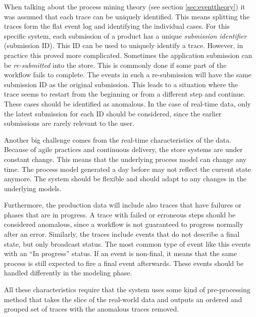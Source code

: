 When talking about the process mining theory (see section \ref{sec:eventtheory}) it was assumed that each trace can be uniquely identified.
This means splitting the traces form the flat event log and identifying the individual cases.
For this specific system, each submission of a product has a unique \emph{submission identifier} (submission ID).
This ID can be used to uniquely identify a trace.
However, in practice this proved more complicated.
Sometimes the application submission can be \textit{re-submitted} into the store.
This is commonly done if some part of the workflow fails to complete.
The events in such a re-submission will have the same submission ID as the original submission.
This leads to a situation where the trace seems to restart from the beginning or from a different step and continue. 
These cases should be identified as anomalous. 
In the case of real-time data, only the latest submission for each ID should be considered, since the earlier submissions are rarely relevant to the user.

Another big challenge comes from the real-time characteristics of the data. 
Because of agile practices and continuous delivery, the store systems are under constant change. 
This means that the underlying process model can change any time.
The process model generated a day before may not reflect the current state anymore. 
The system should be flexible and should adapt to any changes in the underlying models.

Furthermore, the production data will include also traces that have failures or phases that are in progress.
A trace with failed or erroneous steps should be considered anomalous, since a workflow is not guaranteed to progress normally after an error. 
Similarly, the traces include events that do not describe a final state, but only broadcast status. 
The most common type of event like this events with an ``In progress'' status.
If an event is non-final, it means that the same process is still expected to fire a final event afterwards.
These events should be handled differently in the modeling phase.

All these characteristics require that the system uses some kind of pre-processing method that takes the slice of the real-world data and outputs an ordered and grouped set of traces with the anomalous traces removed.

